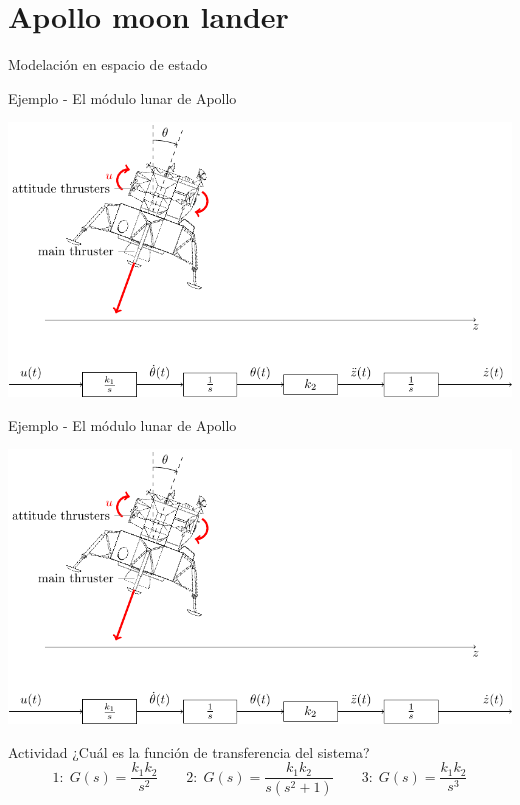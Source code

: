 \documentclass[presentation,aspectratio=1610]{beamer}
\begin{document}
\section{Apollo moon lander}
\label{sec:org516015a}
\begin{frame}[label={sec:orgd2f009f}]{Modelación en espacio de estado}
\end{frame}
\begin{frame}[label={sec:org734459f}]{Ejemplo - El módulo lunar de Apollo}
\begin{center}
\includegraphics[width=\linewidth]{fig-apollo}
\end{center}
\end{frame}
\begin{frame}[label={sec:org74bf6ca}]{Ejemplo - El módulo lunar de Apollo}
\begin{center}
\includegraphics[width=0.8\linewidth]{fig-apollo}
\end{center}
\alert{Actividad} ¿Cuál es la función de transferencia del sistema?
\[1: \; G(s) = \frac{k_1 k_2}{s^2}\qquad 2: \; G(s) = \frac{k_1 k_2}{s(s^2 + 1)} \qquad 3: \; G(s) = \frac{k_1 k_2}{s^3}\]
\end{frame}
\end{document}
